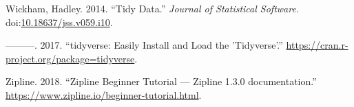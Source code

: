 \documentclass[11pt,preprint, authoryear]{elsarticle}
\numberwithin{equation}{section}
\numberwithin{figure}{section}
\numberwithin{table}{section}
\begin{document}
\hypertarget{ref-Wickham2014}{}
Wickham, Hadley. 2014. ``Tidy Data.'' \emph{Journal of Statistical
Software}.
doi:\href{https://doi.org/10.18637/jss.v059.i10}{10.18637/jss.v059.i10}.

\hypertarget{ref-Wickham2017}{}
---------. 2017. ``tidyverse: Easily Install and Load the 'Tidyverse'.''
\url{https://cran.r-project.org/package=tidyverse}.

\hypertarget{ref-Zipline2018}{}
Zipline. 2018. ``Zipline Beginner Tutorial --- Zipline 1.3.0
documentation.'' \url{https://www.zipline.io/beginner-tutorial.html}.




\end{document}
